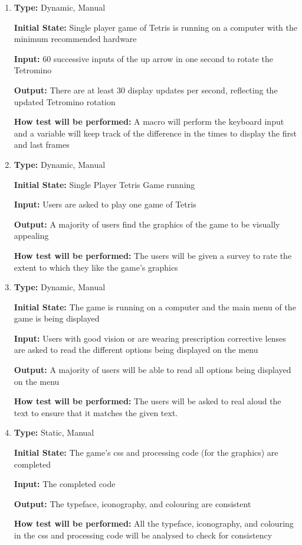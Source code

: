 \documentclass[12pt, titlepage]{article}
\begin{document}
	\begin{enumerate}
		
		\item
		\textbf{Type:} Dynamic, Manual
		
		\textbf{Initial State:} Single player game of Tetris is running on a computer with the minimum recommended hardware
		
		\textbf{Input:} 60 successive inputs of the up arrow in one second to rotate the Tetromino
		
		\textbf{Output:} There are at least 30 display updates per second, reflecting the updated Tetromino rotation
		
		\textbf{How test will be performed:} A macro will perform the keyboard input and a variable will keep track of the difference in the times to display the first and last frames
		
		\item
		\textbf{Type:} Dynamic, Manual
		
		\textbf{Initial State:} Single Player Tetris Game running
		
		\textbf{Input:} Users are asked to play one game of Tetris
		
		\textbf{Output:} A majority of users find the graphics of the game to be visually appealing
		
		\textbf{How test will be performed:} The users will be given a survey to rate the extent to which they like the game's graphics
		
		\item
		\textbf{Type:} Dynamic, Manual
		
		\textbf{Initial State:} The game is running on a computer and the main menu of the game is being displayed
		
		\textbf{Input:} Users with good vision or are wearing prescription corrective lenses are asked to read the different options being displayed on the menu
		
		\textbf{Output:} A majority of users will be able to read all options being displayed on the menu
		
		\textbf{How test will be performed:} The users will be asked to real aloud the text to ensure that it matches the given text.
		
		\item
		\textbf{Type:} Static, Manual
		
		\textbf{Initial State:} The game's css and processing code (for the graphics) are completed
		
		\textbf{Input:} The completed code
		
		\textbf{Output:} The typeface, iconography, and colouring are consistent
		
		\textbf{How test will be performed:} All the typeface, iconography, and colouring in the css and processing code will be analysed to check for consistency
	\end{enumerate}
\end{document}
